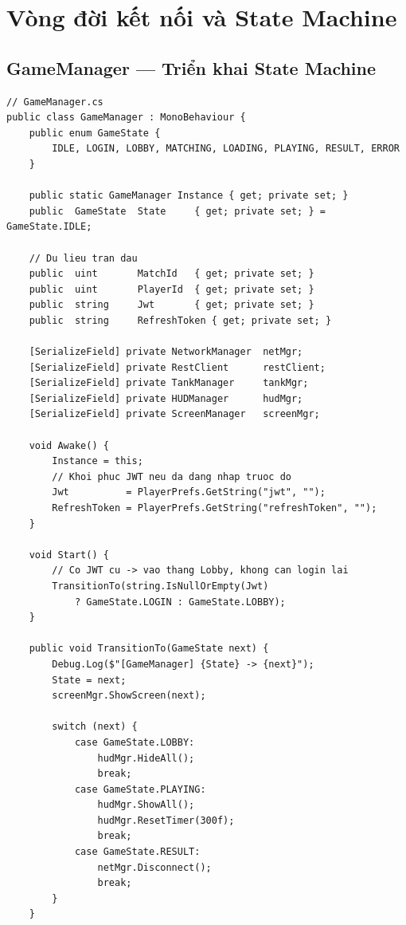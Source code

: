 \documentclass[12pt,a4paper]{report}
\begin{document}
\section{Vòng đời kết nối và State Machine}

\subsection{GameManager --- Triển khai State Machine}

\begin{lstlisting}[style=bashStyle, caption={GameManager --- state machine đầy đủ bằng C\#}, label={lst:gamestates}]
// GameManager.cs
public class GameManager : MonoBehaviour {
    public enum GameState {
        IDLE, LOGIN, LOBBY, MATCHING, LOADING, PLAYING, RESULT, ERROR
    }

    public static GameManager Instance { get; private set; }
    public  GameState  State     { get; private set; } = GameState.IDLE;

    // Du lieu tran dau
    public  uint       MatchId   { get; private set; }
    public  uint       PlayerId  { get; private set; }
    public  string     Jwt       { get; private set; }
    public  string     RefreshToken { get; private set; }

    [SerializeField] private NetworkManager  netMgr;
    [SerializeField] private RestClient      restClient;
    [SerializeField] private TankManager     tankMgr;
    [SerializeField] private HUDManager      hudMgr;
    [SerializeField] private ScreenManager   screenMgr;

    void Awake() {
        Instance = this;
        // Khoi phuc JWT neu da dang nhap truoc do
        Jwt          = PlayerPrefs.GetString("jwt", "");
        RefreshToken = PlayerPrefs.GetString("refreshToken", "");
    }

    void Start() {
        // Co JWT cu -> vao thang Lobby, khong can login lai
        TransitionTo(string.IsNullOrEmpty(Jwt)
            ? GameState.LOGIN : GameState.LOBBY);
    }

    public void TransitionTo(GameState next) {
        Debug.Log($"[GameManager] {State} -> {next}");
        State = next;
        screenMgr.ShowScreen(next);

        switch (next) {
            case GameState.LOBBY:
                hudMgr.HideAll();
                break;
            case GameState.PLAYING:
                hudMgr.ShowAll();
                hudMgr.ResetTimer(300f);
                break;
            case GameState.RESULT:
                netMgr.Disconnect();
                break;
        }
    }


\end{lstlisting}
\end{document}
